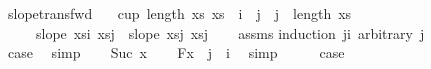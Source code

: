 \begin{isabellebody}
\endisatagproof
{\isafoldproof}%
%
\isadelimproof
\isanewline
%
\endisadelimproof
\isanewline
{}\isamarkupfalse%
\ slope{\isacharunderscore}{\kern0pt}trans{\isacharunderscore}{\kern0pt}fwd{\isacharcolon}{\kern0pt}\isanewline
\ \ \ {\isachardoublequoteopen}cup\ {\isacharparenleft}{\kern0pt}length\ xs{\isacharparenright}{\kern0pt}\ xs{\isachardoublequoteclose}\ \ {\isachardoublequoteopen}i{\isacharplus}{\kern0pt}{}\ {\isacharless}{\kern0pt}\ j\ {\isasymand}\ j\ {\isacharless}{\kern0pt}\ length\ xs{\isachardoublequoteclose}\isanewline
\ \ \ \ \ {\isachardoublequoteopen}slope\ {\isacharparenleft}{\kern0pt}xs{\isacharbang}{\kern0pt}i{\isacharparenright}{\kern0pt}\ {\isacharparenleft}{\kern0pt}xs{\isacharbang}{\kern0pt}{\isacharparenleft}{\kern0pt}j{\isacharminus}{\kern0pt}{}{\isacharparenright}{\kern0pt}{\isacharparenright}{\kern0pt}\ {\isacharless}{\kern0pt}\ slope\ {\isacharparenleft}{\kern0pt}xs{\isacharbang}{\kern0pt}{\isacharparenleft}{\kern0pt}j{\isacharminus}{\kern0pt}{}{\isacharparenright}{\kern0pt}{\isacharparenright}{\kern0pt}\ {\isacharparenleft}{\kern0pt}xs{\isacharbang}{\kern0pt}j{\isacharparenright}{\kern0pt}{\isachardoublequoteclose}\isanewline
%
\isadelimproof
\ \ %
\endisadelimproof
%
\isatagproof
{}\isamarkupfalse%
\ assms{\isacharparenleft}{\kern0pt}{}{\isacharparenright}{\kern0pt}\isanewline
{}\isamarkupfalse%
{\isacharparenleft}{\kern0pt}induction\ {\isachardoublequoteopen}j{\isacharminus}{\kern0pt}i{\isachardoublequoteclose}\ arbitrary{\isacharcolon}{\kern0pt}\ j{\isacharparenright}{\kern0pt}\isanewline
\ \ \isamarkupfalse%
\ {}\isanewline
\ \ \isamarkupfalse%
\ \isamarkupfalse%
\ {\isacharquery}{\kern0pt}case\ \isamarkupfalse%
\ simp\isanewline
{}\isamarkupfalse%
\isanewline
\ \ \isamarkupfalse%
\ {\isacharparenleft}{\kern0pt}Suc\ x{\isacharparenright}{\kern0pt}\isanewline
\ \ \isamarkupfalse%
\ F{}{\isacharcolon}{\kern0pt}{\isachardoublequoteopen}x\ {\isacharequal}{\kern0pt}\ {\isacharparenleft}{\kern0pt}j{\isacharminus}{\kern0pt}{}{\isacharparenright}{\kern0pt}\ {\isacharminus}{\kern0pt}\ i{\isachardoublequoteclose}\ \isamarkupfalse%
\ simp\isanewline
\ \ \isamarkupfalse%
\ \isamarkupfalse%
\ {\isacharquery}{\kern0pt}case\isanewline
\ \ \isamarkupfalse%

\end{isabellebody}
